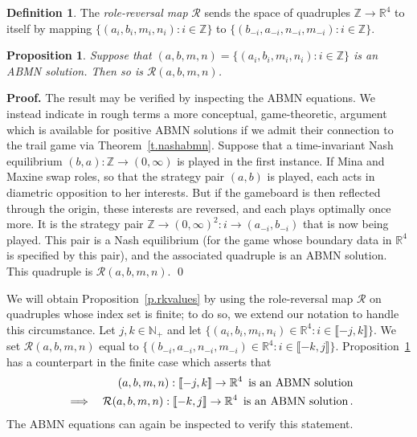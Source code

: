 \documentclass[letterpaper,11pt,oneside,reqno]{amsbook}
\newcommand{\N}{\ensuremath{\mathbb{N}}}
\newcommand{\R}{\ensuremath{\mathbb{R}}}
\newcommand{\Z}{\ensuremath{\mathbb{Z}}}
\numberwithin{figure}{chapter}
\newtheorem{proposition}[theorem]{Proposition}
\theoremstyle{definition}
\theoremstyle{definition}
\theoremstyle{definition}
\newtheorem{definition}[theorem]{Definition}
\theoremstyle{definition}
\theoremstyle{definition}
\newcommand{\mc}{\mathcal}
\newcommand{\nwithoutzero}{\N_+}
\newcommand{\abmnmacspace}{\textrm{ABMN} }
\begin{document}
\begin{definition}\label{d.rolereversal}
The {\em role-reversal map} $\mc{R}$ sends the space of quadruples $\Z \to \R^4$ to itself by mapping
$\big\{ (a_i,b_i,m_i,n_i): i \in \Z \big\}$ to $\big\{ (b_{-i},a_{-i},n_{-i},m_{-i}): i \in \Z \big\}$.
\end{definition}
\begin{proposition}\label{p.rolereversal}
Suppose that $(a,b,m,n) = \big\{ (a_i,b_i,m_i,n_i): i \in \Z \big\}$ is an \abmnmacspace solution. Then so is $\mc{R} (a,b,m,n)$.
\end{proposition}
{\bf Proof.} The result may be verified by inspecting the \abmnmacspace equations. We instead indicate in rough terms a more conceptual, game-theoretic, argument which is available for positive \abmnmacspace solutions if we admit their connection to the trail game via Theorem~\ref{t.nashabmn}. Suppose that a time-invariant Nash equilibrium $(b,a): \Z \to (0,\infty)$  is played in the first instance. If Mina and Maxine swap roles, so that the strategy pair $(a,b)$ is played, each acts in diametric opposition to her interests. But if the gameboard is then reflected through the origin, these interests are reversed, and each plays optimally once more. 
 It is the strategy pair $\Z \to (0,\infty)^2: i \to (a_{-i},b_{-i})$ that is now being played. This pair is a Nash equilibrium (for the game whose boundary data in $\R^4$ is specified by this pair), and the associated quadruple is an \abmnmacspace solution. This quadruple is $\mc{R} (a,b,m,n)$. \qed
  
  We will obtain Proposition~\ref{p.rkvalues} by using the role-reversal map $\mc{R}$ on quadruples whose index set is finite; to do so, we extend our notation to handle this circumstance.
  Let $j,k \in \nwithoutzero$ and let $\big\{ (a_i,b_i,m_i,n_i) \in \R^4: i \in \llbracket -j,k\rrbracket \big\}$. We set $\mc{R}(a,b,m,n)$ equal to  $\big\{ (b_{-i},a_{-i},n_{-i},m_{-i}) \in \R^4: i \in \llbracket -k,j\rrbracket \big\}$.
 Proposition~\ref{p.rolereversal} has a counterpart in the finite case which asserts that
 \begin{eqnarray}
 & & (a,b,m,n): \llbracket -j,k \rrbracket \to \R^4 \, \, \, \textrm{is an \abmnmacspace solution} \label{e.rolereversalfinite} \\
 & \implies & \mc{R}(a,b,m,n): \llbracket -k,j \rrbracket \to \R^4 \, \, \, \textrm{is an \abmnmacspace solution} \nonumber \, .
 \end{eqnarray}
 The \abmnmacspace equations can again be inspected to verify this statement.
 
\end{document}
